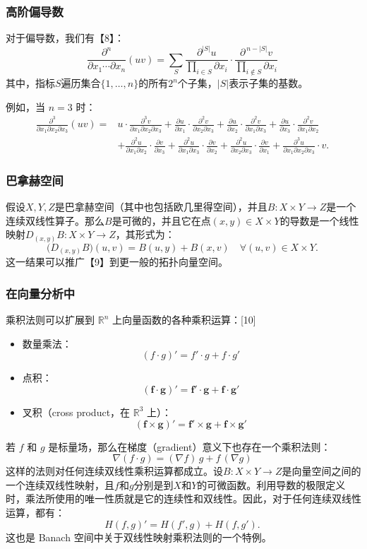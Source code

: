 \subsubsection{高阶偏导数}
对于偏导数，我们有【8】：
$$
\frac{\partial^{n}}{\partial x_{1}\cdots \partial x_{n}}(uv) 
= \sum_{S} 
\frac{\partial^{|S|}u}{\prod_{i\in S}\partial x_{i}}
\cdot
\frac{\partial^{\,n-|S|}v}{\prod_{i\notin S}\partial x_{i}}~
$$
其中，指标$S$遍历集合$\{1,\ldots,n\}$的所有$2^n$个子集，$|S|$表示子集的基数。

例如，当 $n=3$ 时：
$$
\begin{aligned}
\frac{\partial^{3}}{\partial x_{1}\partial x_{2}\partial x_{3}}(uv) 
={}& u \cdot \frac{\partial^{3}v}{\partial x_{1}\partial x_{2}\partial x_{3}}
+ \frac{\partial u}{\partial x_{1}} \cdot \frac{\partial^{2}v}{\partial x_{2}\partial x_{3}}
+ \frac{\partial u}{\partial x_{2}} \cdot \frac{\partial^{2}v}{\partial x_{1}\partial x_{3}}
+ \frac{\partial u}{\partial x_{3}} \cdot \frac{\partial^{2}v}{\partial x_{1}\partial x_{2}} \\
&+ \frac{\partial^{2}u}{\partial x_{1}\partial x_{2}} \cdot \frac{\partial v}{\partial x_{3}}
+ \frac{\partial^{2}u}{\partial x_{1}\partial x_{3}} \cdot \frac{\partial v}{\partial x_{2}}
+ \frac{\partial^{2}u}{\partial x_{2}\partial x_{3}} \cdot \frac{\partial v}{\partial x_{1}}
+ \frac{\partial^{3}u}{\partial x_{1}\partial x_{2}\partial x_{3}} \cdot v.
\end{aligned}~
$$
\subsubsection{巴拿赫空间}
假设$X, Y, Z$是巴拿赫空间（其中也包括欧几里得空间），并且$B : X \times Y \to Z$是一个连续双线性算子。那么$B$是可微的，并且它在点$(x, y)\in X \times Y$的导数是一个线性映射$D_{(x,y)}B : X \times Y \to Z$，其形式为：
$$
\bigl(D_{(x,y)}B\bigr)(u,v) = B(u,y) + B(x,v) \quad \forall (u,v)\in X\times Y.~
$$
这一结果可以推广【9】到更一般的拓扑向量空间。
\subsubsection{在向量分析中}
乘积法则可以扩展到 $\mathbb{R}^n$ 上向量函数的各种乘积运算：[10]
\begin{itemize}
\item 数量乘法：
$$
(f \cdot g)' = f' \cdot g + f \cdot g'~
$$
\item 点积：
$$
(\mathbf{f} \cdot \mathbf{g})' = \mathbf{f}' \cdot \mathbf{g} + \mathbf{f} \cdot \mathbf{g}'~
$$
\item 叉积（cross product，在 $\mathbb{R}^3$ 上）：
$$
(\mathbf{f} \times \mathbf{g})' = \mathbf{f}' \times \mathbf{g} + \mathbf{f} \times \mathbf{g}'~
$$
\end{itemize}
若 $f$ 和 $g$ 是标量场，那么在梯度（gradient）意义下也存在一个乘积法则：
$$
\nabla(f \cdot g) = (\nabla f)\, g + f \, (\nabla g)~
$$
这样的法则对任何连续双线性乘积运算都成立。设$B : X \times Y \to Z$是向量空间之间的一个连续双线性映射，且$f$和$g$分别是到$X$和$Y$的可微函数。利用导数的极限定义时，乘法所使用的唯一性质就是它的连续性和双线性。因此，对于任何连续双线性运算，都有：
$$
H(f,g)' = H(f', g) + H(f, g').~
$$
这也是 Banach 空间中关于双线性映射乘积法则的一个特例。
